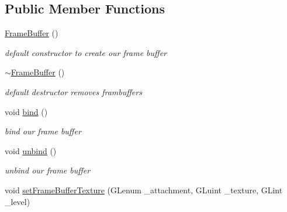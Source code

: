 \subsection*{Public Member Functions}
\begin{DoxyCompactItemize}
\item 
\hypertarget{class_frame_buffer_a6f3763f4551f221b86ca033e2b315c42}{\hyperlink{class_frame_buffer_a6f3763f4551f221b86ca033e2b315c42}{Frame\-Buffer} ()}\label{class_frame_buffer_a6f3763f4551f221b86ca033e2b315c42}

\begin{DoxyCompactList}\small\item\em default constructor to create our frame buffer \end{DoxyCompactList}\item 
\hypertarget{class_frame_buffer_aef8be9884e8cc0fc3f3692e6c6968fa1}{\hyperlink{class_frame_buffer_aef8be9884e8cc0fc3f3692e6c6968fa1}{$\sim$\-Frame\-Buffer} ()}\label{class_frame_buffer_aef8be9884e8cc0fc3f3692e6c6968fa1}

\begin{DoxyCompactList}\small\item\em default destructor removes frambuffers \end{DoxyCompactList}\item 
\hypertarget{class_frame_buffer_a16fa30984714c6070f4c5bde5b5b87f7}{void \hyperlink{class_frame_buffer_a16fa30984714c6070f4c5bde5b5b87f7}{bind} ()}\label{class_frame_buffer_a16fa30984714c6070f4c5bde5b5b87f7}

\begin{DoxyCompactList}\small\item\em bind our frame buffer \end{DoxyCompactList}\item 
\hypertarget{class_frame_buffer_a3b82af89f1c0c0f4c0140e41863256c0}{void \hyperlink{class_frame_buffer_a3b82af89f1c0c0f4c0140e41863256c0}{unbind} ()}\label{class_frame_buffer_a3b82af89f1c0c0f4c0140e41863256c0}

\begin{DoxyCompactList}\small\item\em unbind our frame buffer \end{DoxyCompactList}\item 
\hypertarget{class_frame_buffer_a3acf3a4afec2ebecd93fae3bfba00808}{void \hyperlink{class_frame_buffer_a3acf3a4afec2ebecd93fae3bfba00808}{set\-Frame\-Buffer\-Texture} (G\-Lenum \-\_\-attachment, G\-Luint \-\_\-texture, G\-Lint \-\_\-level)}\label{class_frame_buffer_a3acf3a4afec2ebecd93fae3bfba00808}


\end{DoxyCompactItemize}
